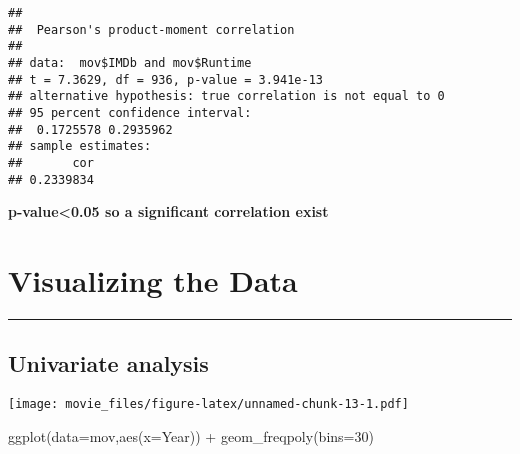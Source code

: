 \documentclass[
]{article}
\newenvironment{Shaded}{\begin{snugshade}}{\end{snugshade}}
\newcommand{\AttributeTok}[1]{\textcolor[rgb]{0.77,0.63,0.00}{#1}}
\newcommand{\DecValTok}[1]{\textcolor[rgb]{0.00,0.00,0.81}{#1}}
\newcommand{\FunctionTok}[1]{\textcolor[rgb]{0.00,0.00,0.00}{#1}}
\newcommand{\NormalTok}[1]{#1}
\newcommand{\SpecialCharTok}[1]{\textcolor[rgb]{0.00,0.00,0.00}{#1}}
\newcommand{\StringTok}[1]{\textcolor[rgb]{0.31,0.60,0.02}{#1}}
\begin{document}
\begin{Shaded}
\end{Shaded}

\begin{verbatim}
## 
##  Pearson's product-moment correlation
## 
## data:  mov$IMDb and mov$Runtime
## t = 7.3629, df = 936, p-value = 3.941e-13
## alternative hypothesis: true correlation is not equal to 0
## 95 percent confidence interval:
##  0.1725578 0.2935962
## sample estimates:
##       cor 
## 0.2339834
\end{verbatim}

\textbf{p-value\textless0.05 so a significant correlation exist}

\hypertarget{visual}{%
\section{\texorpdfstring{\textbf{Visualizing the
Data}}{Visualizing the Data}}\label{visual}}

\begin{center}\rule{0.5\linewidth}{0.5pt}\end{center}

\hypertarget{uni}{%
\subsection{Univariate analysis}\label{uni}}

\begin{Shaded}
\end{Shaded}

\texttt{[image: movie\_files/figure-latex/unnamed-chunk-13-1.pdf]}

\begin{Shaded}
\begin{Highlighting}[]
\FunctionTok{ggplot}\NormalTok{(}\AttributeTok{data=}\NormalTok{mov,}\FunctionTok{aes}\NormalTok{(}\AttributeTok{x=}\NormalTok{Year)) }\SpecialCharTok{+} \FunctionTok{geom\_freqpoly}\NormalTok{(}\AttributeTok{bins=}\DecValTok{30}\NormalTok{)}
\end{Highlighting}
\end{Shaded}
\end{document}
